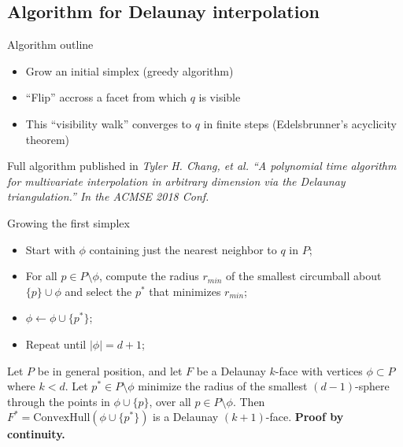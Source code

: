 \documentclass[xcolor=dvipsnames]{beamer}
\begin{document}
\subsection{Algorithm for Delaunay interpolation}
\begin{frame}{Algorithm outline}
\begin{itemize}
\item Grow an initial simplex (greedy algorithm)
\item ``Flip'' accross a facet from which $q$ is visible
\item This ``visibility walk'' converges to $q$ in finite steps
(Edelsbrunner's acyclicity theorem)
\end{itemize}
Full algorithm published in
{\small \it Tyler H. Chang, et al. 
``A polynomial time algorithm for multivariate interpolation in arbitrary
dimension via the Delaunay triangulation.''
In the ACMSE 2018 Conf.}
\end{frame}
\begin{frame}{Growing the first simplex}
\begin{itemize}
\item Start with $\phi$ containing just the nearest neighbor to $q$ in $P$;
\item For all $p \in P \setminus \phi$, compute the radius $r_{min}$ of
the smallest circumball about $\{p\} \cup \phi$ and select the $p^*$
that minimizes $r_{min}$;
\item $\phi \leftarrow \phi \cup \{p^*\}$;
\item Repeat until $|\phi| = d+1$;
\end{itemize}
\begin{lemma}
Let $P$ be in general position, and
let $F$ be a Delaunay $k$-face with vertices $\phi \subset P$ where $k<d$.
Let $p^* \in P \setminus \phi$
minimize the radius of the smallest $(d-1)$-sphere through the points in
$\phi \cup \{p\}$, over all $p \in P \setminus \phi$.
Then $F^* = \text{ConvexHull}(\phi \cup \{p^*\})$ is a Delaunay $(k+1)$-face.
{\bf Proof by continuity.}
\end{lemma}
\end{frame}
\end{document}
